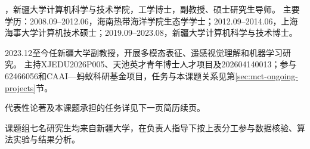 \textbf{}，新疆大学计算机科学与技术学院，工学博士，副教授、硕士研究生导师。
主要学历：2008.09--2012.06，海南热带海洋学院生态学学士；2012.09--2014.06，上海海事大学计算机技术硕士；2019.09--2023.08，新疆大学计算机科学与技术博士。

2023.12至今任新疆大学副教授，开展多模态表征、遥感视觉理解和机器学习研究。
主持XJEDU2026P005、天池英才青年博士人才项目及202604140013；参与62466056和CAAI—蚂蚁科研基金项目，任务与本课题关系见第\ref{sec:mct-ongoing-projects}节。

代表性论著及本课题承担的任务详见下一页简历续页。

课题组七名研究生均来自新疆大学，在负责人指导下按上表分工参与数据核验、算法实验与结果分析。
